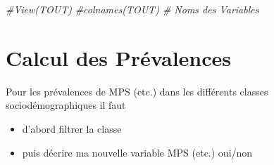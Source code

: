 \documentclass[
]{article}
\newenvironment{Shaded}{\begin{snugshade}}{\end{snugshade}}
\newcommand{\CommentTok}[1]{\textcolor[rgb]{0.56,0.35,0.01}{\textit{#1}}}
\providecommand{\tightlist}{%
  \setlength{\itemsep}{0pt}\setlength{\parskip}{0pt}}
\begin{document}
\begin{Shaded}
\begin{Highlighting}[]
\CommentTok{\#View(TOUT)}
\CommentTok{\#colnames(TOUT)   \# Noms des Variables}
\end{Highlighting}
\end{Shaded}

\hypertarget{calcul-des-pruxe9valences}{%
\section{Calcul des Prévalences}\label{calcul-des-pruxe9valences}}

Pour les prévalences de MPS (etc.) dans les différents classes
sociodémographiques il faut

\begin{itemize}
\tightlist
\item
  d'abord filtrer la classe
\item
  puis décrire ma nouvelle variable MPS (etc.) oui/non
\end{itemize}
\end{document}
